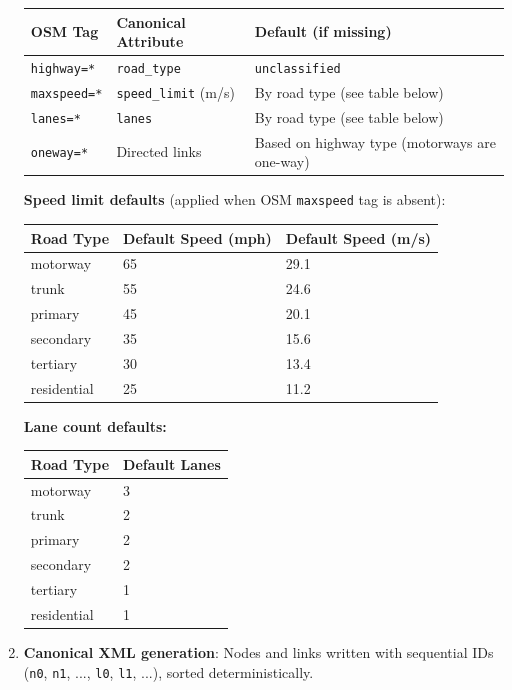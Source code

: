 \begin{enumerate}
  \begin{longtable}[]{@{}lll@{}}
  \toprule\noalign{}
  OSM Tag & Canonical Attribute & Default (if missing) \\
  \midrule\noalign{}
  \endhead
  \bottomrule\noalign{}
  \endlastfoot
  \texttt{highway=*} & \texttt{road\_type} & \texttt{unclassified} \\
  \texttt{maxspeed=*} & \texttt{speed\_limit} (m/s) & By road type (see
  table below) \\
  \texttt{lanes=*} & \texttt{lanes} & By road type (see table below) \\
  \texttt{oneway=*} & Directed links & Based on highway type (motorways
  are one-way) \\
  \end{longtable}

  \textbf{Speed limit defaults} (applied when OSM \texttt{maxspeed} tag
  is absent):

  \begin{longtable}[]{@{}lll@{}}
  \toprule\noalign{}
  Road Type & Default Speed (mph) & Default Speed (m/s) \\
  \midrule\noalign{}
  \endhead
  \bottomrule\noalign{}
  \endlastfoot
  motorway & 65 & 29.1 \\
  trunk & 55 & 24.6 \\
  primary & 45 & 20.1 \\
  secondary & 35 & 15.6 \\
  tertiary & 30 & 13.4 \\
  residential & 25 & 11.2 \\
  \end{longtable}

  \textbf{Lane count defaults:}

  \begin{longtable}[]{@{}ll@{}}
  \toprule\noalign{}
  Road Type & Default Lanes \\
  \midrule\noalign{}
  \endhead
  \bottomrule\noalign{}
  \endlastfoot
  motorway & 3 \\
  trunk & 2 \\
  primary & 2 \\
  secondary & 2 \\
  tertiary & 1 \\
  residential & 1 \\
  \end{longtable}
\item
  \textbf{Canonical XML generation}: Nodes and links written with
  sequential IDs (\texttt{n0}, \texttt{n1}, ..., \texttt{l0},
  \texttt{l1}, ...), sorted deterministically.
\end{enumerate}

